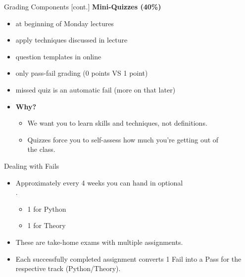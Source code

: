 \documentclass[professionalfonts, xcolor={usenames,svgnames,x11names,table}]{beamer}
\begin{document}
\begin{frame}{Grading Components [cont.]}
    \textbf{Mini-Quizzes (40\%)}
        \begin{itemize}
            \item at beginning of Monday lectures
            \item apply techniques discussed in lecture\\
            \item question templates in online 
            \item only pass-fail grading (0 points VS 1 point)
            \item missed quiz is an automatic fail (more on that later)
            \item \textbf{Why?}
                \begin{itemize}
                    \item We want you to learn skills and techniques, not definitions.
                    \item Quizzes force you to self-assess how much you're getting out of\\
                        the class.
                \end{itemize}
        \end{itemize}
\end{frame}

\begin{frame}{Dealing with Fails}
    \begin{itemize}
        \item Approximately every 4 weeks you can hand in optional\\
            .
            \begin{itemize}
                \item 1 for Python
                \item 1 for Theory
            \end{itemize}
        \item These are take-home exams with multiple assignments.
        \item Each successfully completed assignment converts 1 Fail into a Pass for the respective track (Python\slash Theory).
    \end{itemize}
\end{frame}
\end{document}

